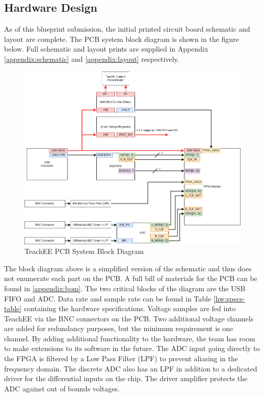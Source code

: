 \documentclass[letterpaper,12pt]{article}
\begin{document}
\subsection{Hardware Design}
As of this blueprint submission, the initial printed circuit board schematic and
layout are complete. The PCB system block diagram is shown in the figure below.
Full schematic and layout prints are supplied in Appendix
\ref{appendix:schematic} and \ref{appendix:layout} respectively.
\begin{figure}[H]
    \centering
    \includegraphics[width=16cm]{../../misc/TeachEE-System-Diagram.drawio.png}
    \caption{TeachEE PCB System Block Diagram}
    \label{fig:pcb-block-diagram}
\end{figure}

The block diagram above is a simplified version of the schematic and thus does
not enumerate each part on the PCB. A full bill of materials for the PCB can be
found in \ref{appendix:bom}. The two critical blocks of the diagram are the USB
FIFO and ADC. Data rate and sample rate can be found in Table
\ref{hw:specs-table} containing the hardware specifications. Voltage samples are
fed into TeachEE via the BNC connectors on the PCB. Two additional voltage
channels are added for redundancy purposes, but the minimum requirement is one
channel. By adding additional functionality to the hardware, the team has room
to make extensions to its software in the future. The ADC input going directly
to the FPGA is filtered by a Low Pass Filter (LPF) to prevent aliasing in the
frequency domain. The discrete ADC also has an LPF in addition to a dedicated
driver for the differential inputs on the chip. The driver amplifier protects
the ADC against out of bounds voltages.
\end{document}
